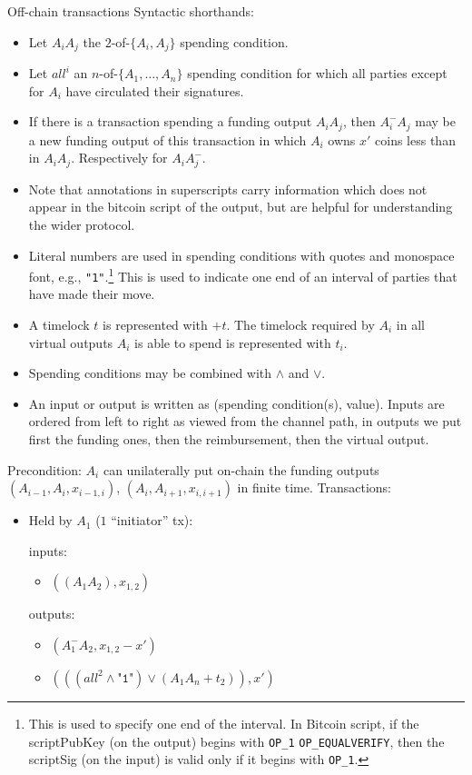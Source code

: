 \begin{notitlebox}{Off-chain transactions}
  Syntactic shorthands:
  \begin{itemize}
    \item Let $A_i A_j$ the $2$-of-$\{A_i, A_j\}$ spending condition.
    \item Let $\mathit{all}^i$ an $n$-of-$\{A_1, \dots, A_n\}$ spending
    condition for which all parties except for $A_i$ have circulated their
    signatures.
    \item If there is a transaction spending a funding output $A_i A_j$, then
    $A_i^{-} A_j$ may be a new funding output of this transaction in which $A_i$
    owns $x'$ coins less than in $A_i A_j$. Respectively for $A_i A_j^{-}$.
    \item Note that annotations in superscripts carry information which does
    not appear in the bitcoin script of the output, but are helpful for
    understanding the wider protocol.
    \item Literal numbers are used in spending conditions with quotes and
    monospace font, e.g., \texttt{"1"}.\footnote{This is used to specify one end
    of the interval. In Bitcoin script, if the scriptPubKey (on the output)
    begins with \texttt{OP\_1} \texttt{OP\_EQUALVERIFY}, then the scriptSig (on
    the input) is valid only if it begins with \texttt{OP\_1}.} This is used to
    indicate one end of an interval of parties that have made their move.
    \item A timelock $t$ is represented with $+t$. The timelock required by
    $A_i$ in all virtual outputs $A_i$ is able to spend is represented with
    $t_i$.
    \item Spending conditions may be combined with $\wedge$ and $\vee$.
    \item An input or output is written as (spending condition(s), value).
    Inputs are ordered from left to right as viewed from the channel path, in
    outputs we put first the funding ones, then the reimbursement, then the
    virtual output.
  \end{itemize}
  Precondition: $A_i$ can unilaterally put on-chain the funding outputs
  $(A_{i-1}, A_i, x_{i-1, i})$, $(A_i, A_{i+1}, x_{i, i+1})$ in finite time.
  Transactions:
  \begin{itemize}
    \item Held by $A_1$ ($1$ ``initiator'' tx):

    inputs:
    \begin{itemize}
      \item $((A_1 A_2), x_{1,2})$
    \end{itemize}
    outputs:
    \begin{itemize}
      \item $(A_1^- A_2, x_{1,2} - x')$
      \item $(((\mathit{all}^2 \wedge \texttt{"1"}) \vee (A_1 A_n + t_2)), x')$
    \end{itemize}


\end{itemize}
\end{notitlebox}
